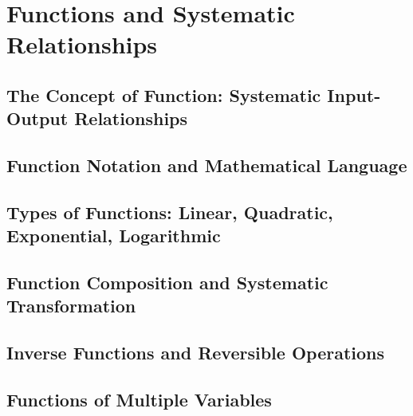 

\chapter{Functions and Systematic Relationships}

\section{The Concept of Function: Systematic Input-Output Relationships}

\section{Function Notation and Mathematical Language}

\section{Types of Functions: Linear, Quadratic, Exponential, Logarithmic}

\section{Function Composition and Systematic Transformation}

\section{Inverse Functions and Reversible Operations}

\section{Functions of Multiple Variables}
